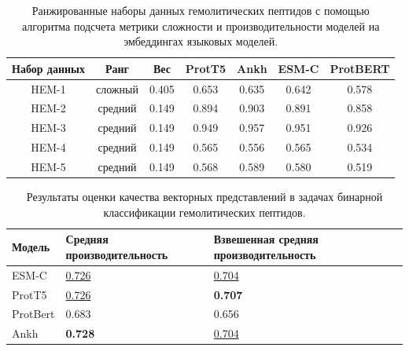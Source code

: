 \documentclass[specification,annotation,times]{itmo-student-thesis}
\begin{document}
\begin{table}[h]
\centering
\caption{Ранжированные наборы данных гемолитических пептидов с помощью алгоритма подсчета метрики сложности и производительности моделей на эмбеддингах языковых моделей.}
\label{tab:model_performance_hem}

\begin{tabular}{|c|c|c|c|c|c|c|}
\hline
Набор данных & Ранг & Вес & ProtT5 & Ankh & ESM-C & ProtBERT \\
\hline
HEM-1 & сложный & 0.405 & 0.653 & 0.635 & 0.642 & 0.578 \\ \hline
HEM-2 & средний & 0.149 & 0.894 & 0.903 & 0.891 & 0.858 \\ \hline
HEM-3 & средний & 0.149 & 0.949 & 0.957 & 0.951 & 0.926 \\ \hline
HEM-4 & средний & 0.149 & 0.565 & 0.556 & 0.565 & 0.534 \\ \hline
HEM-5 & средний & 0.149 & 0.568 & 0.589 & 0.580 & 0.519 \\ \hline
\end{tabular}

\end{table}


\begin{table}[h]
\centering

\caption{Результаты оценки качества векторных представлений в задачах бинарной классификации гемолитических пептидов.}
\label{tab:compare_results_hem}
\begin{tabular}{|p{3cm}|p{5cm}|p{5cm}|}
\hline
Модель & Средняя \newline производительность & Взвешенная \newline средняя \newline производительность \\
\hline
ESM-C & \underline{0.726} & \underline{0.704} \\ \hline
ProtT5 & \underline{0.726} & \textbf{0.707} \\ \hline
ProtBert & 0.683 & 0.656 \\ \hline
Ankh & \textbf{0.728} & \underline{0.704} \\ \hline
\end{tabular}

\end{table}
\end{document}
